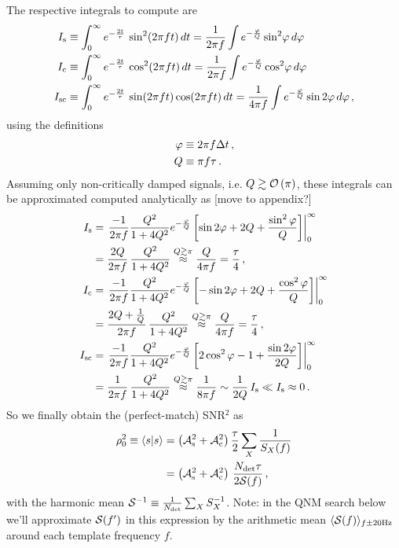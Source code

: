 \documentclass[aps,prd,onecolumn,notitlepage,nofootinbib,superscriptaddress,altaffilletter,floatfix]{revtex4-1}
\begin{document}
The respective integrals to compute are
\begin{align}
  \label{eq:18}
  I_{\mathrm{s}} &\equiv \int_0^\infty e^{-\frac{2t}{\tau}}\,\sin^2(2\pi f t)\,dt = \frac{1}{2\pi f}\int e^{-\frac{\varphi}{Q}} \sin^2\!\varphi\,d\varphi\\
  I_{\mathrm{c}} &\equiv \int_0^\infty e^{-\frac{2t}{\tau}}\,\cos^2(2\pi f t)\,dt = \frac{1}{2\pi f}\int e^{-\frac{\varphi}{Q}} \cos^2\!\varphi\,d\varphi\\
  I_{\mathrm{sc}} &\equiv \int_0^\infty e^{-\frac{2t}{\tau}}\,\sin(2\pi f t)\cos(2\pi f t)\,dt = \frac{1}{4\pi f}\int e^{-\frac{\varphi}{Q}} \sin2\varphi\,d\varphi\,,
\end{align}
using the definitions
\begin{align}
  \label{eq:3}
  \varphi &\equiv 2\pi f \Delta t\,,\\
  Q       &\equiv \pi f \tau\,.
\end{align}
Assuming only non-critically damped signals, i.e. $Q\gtrsim \mathcal{O}\left(\pi\right)$, these integrals can be approximated computed analytically as [move to
appendix?]
\begin{align}
  \label{eq:19}
  I_{\mathrm{s}} &= \left. \frac{-1}{2\pi f}\frac{Q^2}{1 + 4Q^2}e^{-\frac{\varphi}{Q}}\left[ \sin2\varphi + 2Q + \frac{\sin^2\varphi}{Q}\right]\right|_0^\infty\\
  &= \frac{2Q}{2\pi f}\,\frac{Q^2}{1+4Q^2} \stackrel{Q\gtrsim\pi}{\approx} \frac{Q}{4\pi f} = \frac{\tau}{4}\,,\\
  I_{\mathrm{c}} &= \left. \frac{-1}{2\pi f}\frac{Q^2}{1 + 4Q^2}e^{-\frac{\varphi}{Q}}\left[ -\sin2\varphi + 2Q + \frac{\cos^2\varphi}{Q}\right]\right|_0^\infty\\
  &= \frac{2Q + \frac{1}{Q}}{2\pi f}\,\frac{Q^2}{1+4Q^2} \stackrel{Q\gtrsim\pi}{\approx} \frac{Q}{4\pi f} = \frac{\tau}{4}\,,\\
  I_{\mathrm{sc}} &= \left. \frac{-1}{2\pi f}\frac{Q^2}{1 + 4Q^2}e^{-\frac{\varphi}{Q}}\left[ 2\cos^2\varphi - 1 + \frac{\sin2\varphi}{2Q}\right]\right|_0^\infty\\
  &= \frac{1}{2\pi f}\,\frac{Q^2}{1+4Q^2} \stackrel{Q\gtrsim\pi}{\approx} \frac{1}{8\pi f} \sim \frac{1}{2Q}\,I_{\mathrm{s}} \ll I_{\mathrm{s}} \approx 0\,.
\end{align}
So we finally obtain the (perfect-match) SNR$^2$ as
\begin{align}
  \label{eq:20}
  \rho_0^2 \equiv \langle s|s\rangle &= \left(\mathcal{A}_{\mathrm{s}}^2 + \mathcal{A}_{\mathrm{c}}^2\right)\frac{\tau}{2}\sum_X \frac{1}{S_X(f)}\\
  &=\left(\mathcal{A}_{\mathrm{s}}^2 + \mathcal{A}_{\mathrm{c}}^2\right)\,\frac{N_{\mathrm{det}}\tau}{2\mathcal{S}(f)}\,,
\end{align}
with the harmonic mean $\mathcal{S}^{-1} \equiv \frac{1}{N_{\mathrm{det}}}\sum_X S_X^{-1}$.
Note: in the QNM search below we'll approximate $\mathcal{S}(f')$ in this expression by the arithmetic mean $\langle\mathcal{S}(f)\rangle_{f\pm20\mathrm{Hz}}$ around each
template frequency $f$.
\end{document}
